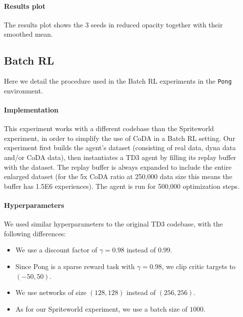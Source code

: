 \documentclass[coda.tex]{subfiles}
\begin{document}
\paragraph{Results plot} The results plot shows the 3 seeds in reduced opacity together with their smoothed mean.


\subsection{Batch RL}
Here we detail the procedure used in the Batch RL experiments in the \texttt{Pong} environment.

\paragraph{Implementation} This experiment works with a different codebase than the Spriteworld experiment, in order to simplify the use of CoDA in a Batch RL setting. Our experiment first builds the agent's dataset (consisting of real data, dyna data and/or CoDA data), then instantiates a TD3 agent by filling its replay buffer with the dataset. The replay buffer is always expanded to include the entire enlarged dataset (for the 5x CoDA ratio at 250,000 data size this means the buffer has 1.5E6 experiences). The agent is run for 500,000 optimization steps.

\paragraph{Hyperparameters} We used similar hyperparameters to the original TD3 codebase, with the following differences:
\begin{itemize}
\item We use a discount factor of $\gamma = 0.98$ instead of 0.99. 
\item Since Pong is a sparse reward task with $\gamma = 0.98$, we clip critic targets to $(-50, 50)$.
\item We use networks of size $(128, 128)$ instead of $(256, 256)$. 
\item As for our Spriteworld experiment, we use a batch size of $1000$. 
\end{itemize}
\end{document}
